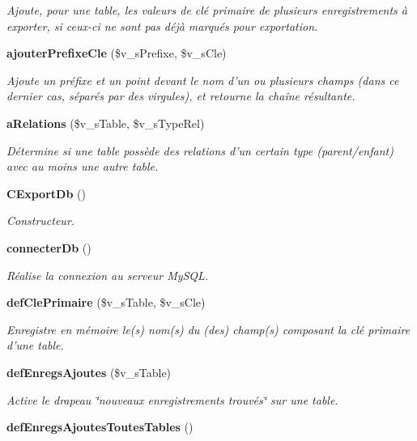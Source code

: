 \begin{CompactItemize}
\begin{CompactList}\small\item\em Ajoute, pour une table, les valeurs de clé primaire de plusieurs enregistrements à exporter, si ceux-ci ne sont pas déjà marqués pour exportation. \item\end{CompactList}\item 
{\bf ajouterPrefixeCle} (\$v\_\-sPrefixe, \$v\_\-sCle)
\begin{CompactList}\small\item\em Ajoute un préfixe et un point devant le nom d'un ou plusieurs champs (dans ce dernier cas, séparés par des virgules), et retourne la chaîne résultante. \item\end{CompactList}\item 
{\bf aRelations} (\$v\_\-sTable, \$v\_\-sTypeRel)
\begin{CompactList}\small\item\em Détermine si une table possède des relations d'un certain type (parent/enfant) avec au moins une autre table. \item\end{CompactList}\item 
{\bf CExportDb} ()\label{class_c_export_db_7c48d5e504c989e9bf5ed6265af91474}

\begin{CompactList}\small\item\em Constructeur. \item\end{CompactList}\item 
{\bf connecterDb} ()
\begin{CompactList}\small\item\em Réalise la connexion au serveur MySQL. \item\end{CompactList}\item 
{\bf defClePrimaire} (\$v\_\-sTable, \$v\_\-sCle)
\begin{CompactList}\small\item\em Enregistre en mémoire le(s) nom(s) du (des) champ(s) composant la clé primaire d'une table. \item\end{CompactList}\item 
{\bf defEnregsAjoutes} (\$v\_\-sTable)
\begin{CompactList}\small\item\em Active le drapeau \char`\"{}nouveaux enregistrements trouvés\char`\"{} sur une table. \item\end{CompactList}\item 
{\bf defEnregsAjoutesToutesTables} ()\label{class_c_export_db_20c1fa883273f9d2341928faf58659b0}


\end{CompactItemize}
